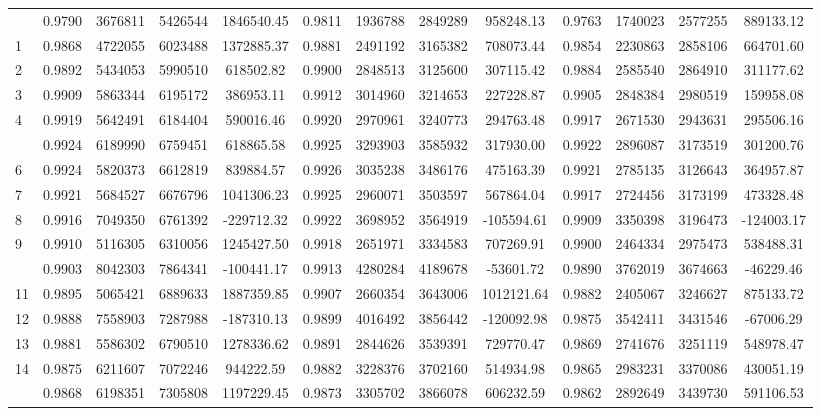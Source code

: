 \documentclass[
  12pt,
]{article}
\begin{document}
\begin{longtable}[t]{lcccccccccccc}
\endfoot
\bottomrule
\endlastfoot
0 & 0.9790 & 3676811 & 5426544 & 1846540.45 & 0.9811 & 1936788 & 2849289 & 958248.13 & 0.9763 & 1740023 & 2577255 & 889133.12\\
1 & 0.9868 & 4722055 & 6023488 & 1372885.37 & 0.9881 & 2491192 & 3165382 & 708073.44 & 0.9854 & 2230863 & 2858106 & 664701.60\\
2 & 0.9892 & 5434053 & 5990510 & 618502.82 & 0.9900 & 2848513 & 3125600 & 307115.42 & 0.9884 & 2585540 & 2864910 & 311177.62\\
3 & 0.9909 & 5863344 & 6195172 & 386953.11 & 0.9912 & 3014960 & 3214653 & 227228.87 & 0.9905 & 2848384 & 2980519 & 159958.08\\
4 & 0.9919 & 5642491 & 6184404 & 590016.46 & 0.9920 & 2970961 & 3240773 & 294763.48 & 0.9917 & 2671530 & 2943631 & 295506.16\\
\addlinespace
5 & 0.9924 & 6189990 & 6759451 & 618865.58 & 0.9925 & 3293903 & 3585932 & 317930.00 & 0.9922 & 2896087 & 3173519 & 301200.76\\
6 & 0.9924 & 5820373 & 6612819 & 839884.57 & 0.9926 & 3035238 & 3486176 & 475163.39 & 0.9921 & 2785135 & 3126643 & 364957.87\\
7 & 0.9921 & 5684527 & 6676796 & 1041306.23 & 0.9925 & 2960071 & 3503597 & 567864.04 & 0.9917 & 2724456 & 3173199 & 473328.48\\
8 & 0.9916 & 7049350 & 6761392 & -229712.32 & 0.9922 & 3698952 & 3564919 & -105594.61 & 0.9909 & 3350398 & 3196473 & -124003.17\\
9 & 0.9910 & 5116305 & 6310056 & 1245427.50 & 0.9918 & 2651971 & 3334583 & 707269.91 & 0.9900 & 2464334 & 2975473 & 538488.31\\
\addlinespace
10 & 0.9903 & 8042303 & 7864341 & -100441.17 & 0.9913 & 4280284 & 4189678 & -53601.72 & 0.9890 & 3762019 & 3674663 & -46229.46\\
11 & 0.9895 & 5065421 & 6889633 & 1887359.85 & 0.9907 & 2660354 & 3643006 & 1012121.64 & 0.9882 & 2405067 & 3246627 & 875133.72\\
12 & 0.9888 & 7558903 & 7287988 & -187310.13 & 0.9899 & 4016492 & 3856442 & -120092.98 & 0.9875 & 3542411 & 3431546 & -67006.29\\
13 & 0.9881 & 5586302 & 6790510 & 1278336.62 & 0.9891 & 2844626 & 3539391 & 729770.47 & 0.9869 & 2741676 & 3251119 & 548978.47\\
14 & 0.9875 & 6211607 & 7072246 & 944222.59 & 0.9882 & 3228376 & 3702160 & 514934.98 & 0.9865 & 2983231 & 3370086 & 430051.19\\
\addlinespace
15 & 0.9868 & 6198351 & 7305808 & 1197229.45 & 0.9873 & 3305702 & 3866078 & 606232.59 & 0.9862 & 2892649 & 3439730 & 591106.53\\

\end{longtable}
\end{document}
